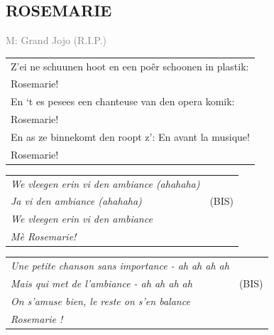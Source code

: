 \documentclass[a4paper, 14pt]{extarticle}
\begin{document}
\subsection*{ROSEMARIE}
\textcolor{gray}{\small M: Grand Jojo (R.I.P.)}\par
\begin{tabularx}{\textwidth}{>{\raggedright\arraybackslash}X}
    Z’ei ne schuunen hoot en een poêr schoonen in plastik:\\
Rosemarie!\\
En ‘t es pesees een chanteuse van den opera komik:\\
Rosemarie!\\
En as ze binnekomt den roopt z’: En avant la musique!\\
Rosemarie!\\
\end{tabularx}
\par
\begin{tabularx}{0.8\textwidth}{>{\raggedright\arraybackslash}X c}
    \textit{We vleegen erin vi den ambiance (ahahaha)}\\
\textit{Ja vi den ambiance (ahahaha)} & (BIS)\\
\textit{We vleegen erin vi den ambiance}\\
    \textit{Mè Rosemarie!}\\
\end{tabularx}
\par
{}
\begin{tabularx}{0.8\textwidth}{>{\raggedright\arraybackslash}X c}
    \textit{Une petite chanson sans importance - ah ah ah ah}\\
    \textit{Mais qui met de l'ambiance - ah ah ah ah} & (BIS)\\
    \textit{On s'amuse bien, le reste on s'en balance}\\
    \textit{Rosemarie !}\\
\end{tabularx}
\end{document}
